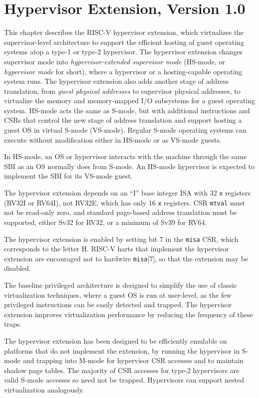 \chapter{Hypervisor Extension, Version 1.0}
\label{hypervisor}

This chapter describes the RISC-V hypervisor extension, which virtualizes the
supervisor-level architecture to support the efficient hosting of guest
operating systems atop a type-1 or type-2 hypervisor.
The hypervisor extension changes supervisor mode into
{\em hypervisor-extended supervisor mode} (HS-mode, or {\em hypervisor
mode} for short), where a hypervisor or a hosting-capable operating system
runs.  The hypervisor extension also adds another stage of address translation,
from {\em guest physical addresses} to supervisor physical addresses,
to virtualize the
memory and memory-mapped I/O subsystems for a guest operating system.  HS-mode
acts the same as S-mode, but with additional instructions and CSRs that control
the new stage of address translation and support hosting a guest OS in virtual
S-mode (VS-mode).
Regular S-mode operating systems can execute without modification either in
HS-mode or as VS-mode guests.

In HS-mode, an OS or hypervisor interacts with the machine through the same
SBI as an OS normally does from S-mode.  An HS-mode hypervisor is expected to
implement the SBI for its VS-mode guest.

The hypervisor extension depends on an ``I'' base integer ISA with
32 {\tt x} registers (RV32I or RV64I), not RV32E, which has only
16 {\tt x} registers.
CSR {\tt mtval} must not be read-only zero, and
standard page-based address translation must be supported, either
Sv32 for RV32, or a minimum of Sv39 for RV64.

The hypervisor extension is enabled by setting bit 7 in the {\tt misa} CSR,
which corresponds to the letter H.
RISC-V harts that implement the hypervisor extension are encouraged
not to hardwire {\tt misa}[7], so that the extension may be disabled.

\begin{commentary}
The baseline privileged architecture is designed to simplify the use of classic
virtualization techniques, where a guest OS is run at user-level, as
the few privileged instructions can be easily detected and trapped.
The hypervisor extension improves virtualization performance by
reducing the frequency of these traps.

The hypervisor extension has been designed to be efficiently
emulable on platforms that do not implement the extension, by running
the hypervisor in S-mode and trapping into M-mode for hypervisor CSR accesses
and to maintain shadow page tables.  The majority of CSR accesses for
type-2 hypervisors are valid S-mode accesses so need not be trapped.
Hypervisors can support nested virtualization analogously.
\end{commentary}

